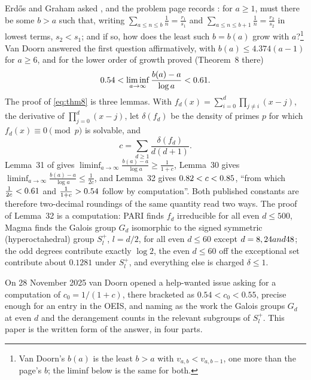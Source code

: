 \documentclass[11pt]{article}
\newcommand{\lia}{\liminf_{a\to\infty}\frac{b(a)-a}{\log a}}
\newcommand{\Sl}{S_l^{+}}
\begin{document}
Erd\H{o}s and Graham asked \cite[p.~34]{EG80}, and the problem page records \cite{EP290}: for $a\ge1$, must there be some $b>a$ such that, writing $\sum_{a\le n\le b}\frac1n=\frac{r_1}{s_1}$ and $\sum_{a\le n\le b+1}\frac1n=\frac{r_2}{s_2}$ in lowest terms, $s_2<s_1$; and if so, how does the least such $b=b(a)$ grow with $a$?\footnote{Van Doorn's $b(a)$ \cite{vD24,vD26} is the least $b>a$ with $v_{a,b}<v_{a,b-1}$, one more than the page's $b$; the liminf below is the same for both.} Van Doorn \cite{vD24} answered the first question affirmatively, with $b(a)\le4.374(a-1)$ for $a\ge6$, and for the lower order of growth proved (Theorem~8 there)
\begin{equation}\label{eq:thm8}
\VDLo<\lia<\VDHi .
\end{equation}
The proof of \eqref{eq:thm8} is three lemmas. With $f_d(x)=\sum_{i=0}^d\prod_{j\ne i}(x-j)$, the derivative of $\prod_{j=0}^d(x-j)$, let $\delta(f_d)$ be the density of primes $p$ for which $f_d(x)\equiv0\pmod p$ is solvable, and
\begin{equation}\label{eq:c}
c=\sum_{d\ge1}\frac{\delta(f_d)}{d(d+1)} .
\end{equation}
Lemma~31 of \cite{vD24} gives $\lia\ge\frac1{1+c}$, Lemma~30 gives $\lia\le\frac1{2c}$, and Lemma~32 gives $0.82<c<0.85$, ``from which $\frac1{2c}<0.61$ and $\frac1{1+c}>0.54$ follow by computation''. Both published constants are therefore two-decimal roundings of the same quantity read two ways. The proof of Lemma~32 is a computation: PARI finds $f_d$ irreducible for all even $d\le500$, Magma finds the Galois group $G_d$ isomorphic to the signed symmetric (hyperoctahedral) group $\Sl$, $l=d/2$, for all even $d\le60$ except $d=8, 24 and 48$; the odd degrees contribute exactly $\log2$, the even $d\le60$ off the exceptional set contribute about $0.1281$ under $\Sl$, and everything else is charged $\delta\le1$.

On 28 November 2025 van Doorn opened a help-wanted issue \cite{Issue164} asking for a computation of $c_0=1/(1+c)$, there bracketed as $0.54<c_0<0.55$, precise enough for an entry in the OEIS, and naming as the work the Galois groups $G_d$ at even $d$ and the derangement counts in the relevant subgroups of $\Sl$. This paper is the written form of the answer, in four parts.
\end{document}
